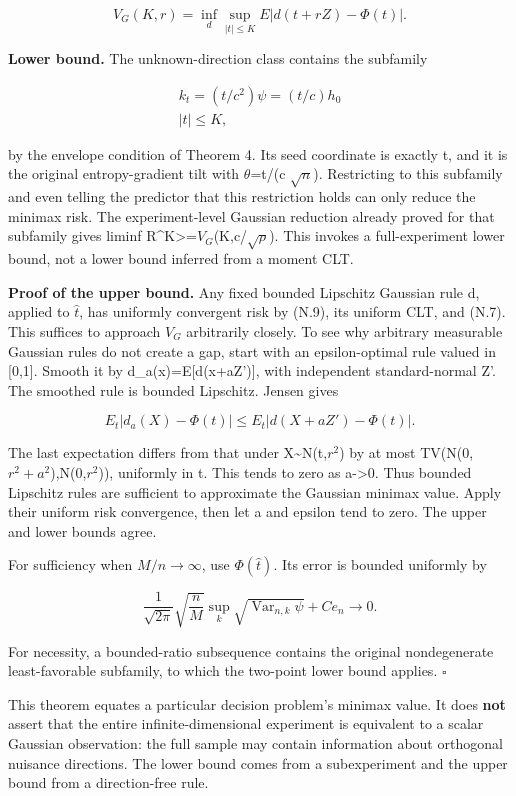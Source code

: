 \[
V_G(K,r)=\inf_d\sup_{|t|\le K}E|d(t+rZ)-\Phi(t)|.
\]

\textbf{Lower bound.} The unknown-direction class contains the subfamily

\[
\begin{gathered}
k_t=(t/c^2)\psi=(t/c)h_0 \\
|t|\le K,
\end{gathered}
\]

by the envelope condition of Theorem 4. Its seed coordinate is exactly t, and it is the original entropy-gradient tilt with \(\theta\)=t/(c \(\sqrt n\)). Restricting to this subfamily and even telling the predictor that this restriction holds can only reduce the minimax risk. The experiment-level Gaussian reduction already proved for that subfamily gives liminf R\^{}K\textgreater=\(V_G\)(K,c/\(\sqrt\rho\)). This invokes a full-experiment lower bound, not a lower bound inferred from a moment CLT.

\textbf{Proof of the upper bound.} Any fixed bounded Lipschitz Gaussian rule d, applied to \(\widehat t\), has uniformly convergent risk by (N.9), its uniform CLT, and (N.7). This suffices to approach \(V_G\) arbitrarily closely. To see why arbitrary measurable Gaussian rules do not create a gap, start with an epsilon-optimal rule valued in {[}0,1{]}. Smooth it by d\_a(x)=E{[}d(x+aZ'){]}, with independent standard-normal Z'. The smoothed rule is bounded Lipschitz. Jensen gives

\[
E_t|d_a(X)-\Phi(t)|
\le E_t|d(X+aZ')-\Phi(t)|.
\]

The last expectation differs from that under X\textasciitilde N(t,\(r^2\)) by at most TV(N(0,\(r^2+a^2\)),N(0,\(r^2\))), uniformly in t. This tends to zero as a-\textgreater0. Thus bounded Lipschitz rules are sufficient to approximate the Gaussian minimax value. Apply their uniform risk convergence, then let a and epsilon tend to zero. The upper and lower bounds agree.

For sufficiency when \(M/n\to\infty\), use \(\Phi(\widehat t)\). Its error is bounded uniformly by

\[
\frac1{\sqrt{2\pi}}\sqrt{\frac nM}
\sup_k\sqrt{\operatorname{Var}_{n,k}\psi}+Ce_n\to0.
\]

For necessity, a bounded-ratio subsequence contains the original nondegenerate least-favorable subfamily, to which the two-point lower bound applies. \(\square\)

This theorem equates a particular decision problem's minimax value. It does \textbf{not} assert that the entire infinite-dimensional experiment is equivalent to a scalar Gaussian observation: the full sample may contain information about orthogonal nuisance directions. The lower bound comes from a subexperiment and the upper bound from a direction-free rule.

